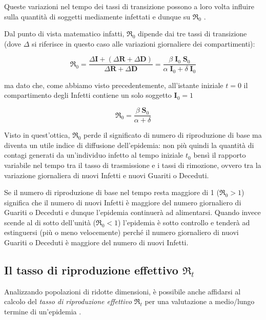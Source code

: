 \documentclass[11pt]{article}
\begin{document}
Queste variazioni nel tempo dei tassi di transizione possono a loro
volta influire sulla quantità di soggetti mediamente infettati e dunque
su \(\Re_0\) \cite{department_of_health} \cite{ceps_pubblication}
\cite{kissler_tedijanto_lipsitch_grad_2020}.

Dal punto di vista matematico infatti, \(\Re_0\) dipende dai tre tassi
di transizione (dove \(\Delta\) si riferisce in questo caso alle
variazioni giornaliere dei compartimenti):

\[ \Re_0 = \frac{ \Delta\mathbf{I} + (\Delta\mathbf{R} + \Delta\mathbf{D})}{ \Delta\mathbf{R} + \Delta\mathbf{D} } = \frac{ \beta \; \mathbf{I}_0 \; \mathbf{S}_0 }{ \alpha \; \mathbf{I}_0 + \delta \; \mathbf{I}_0} \]

ma dato che, come abbiamo visto precedentemente, all'istante iniziale
\(t=0\) il compartimento degli Infetti contiene un solo soggetto
\(\mathbf{I}_0 = 1\)

\[ \Re_0 = \frac{ \beta \; \mathbf{S}_0 }{ \alpha + \delta } \]

Visto in quest'ottica, \(\Re_0\) perde il significato di numero di
riproduzione di base ma diventa un utile indice di diffusione
dell'epidemia: non più quindi la quantità di contagi generati da
un'individuo infetto al tempo iniziale \(t_0\) bensì il rapporto
variabile nel tempo tra il tasso di trasmissione e i tassi di rimozione,
ovvero tra la variazione giornaliera di nuovi Infetti e nuovi Guariti o
Deceduti.

Se il numero di riproduzione di base nel tempo resta maggiore di 1
(\(\Re_0 > 1\)) significa che il numero di nuovi Infetti è maggiore del
numero giornaliero di Guariti o Deceduti e dunque l'epidemia continuerà
ad alimentarsi. Quando invece scende al di sotto dell'unità
(\(\Re_0 < 1\)) l'epidemia è sotto controllo e tenderà ad estinguersi
(più o meno velocemente) perché il numero giornaliero di nuovi Guariti o
Deceduti è maggiore del numero di nuovi Infetti.

    \hypertarget{il-tasso-di-riproduzione-effettivo-re_t}{%
\subsection{\texorpdfstring{Il tasso di riproduzione effettivo
\(\Re_t\)}{Il tasso di riproduzione effettivo \textbackslash Re\_t}}\label{il-tasso-di-riproduzione-effettivo-re_t}}

    Analizzando popolazioni di ridotte dimensioni, è possibile anche
affidarsi al calcolo del \emph{tasso di riproduzione effettivo}
\(\Re_t\) per una valutazione a medio/lungo termine di un'epidemia
\cite{k-sys} \cite{bettencourt_ribeiro_2008}.
\end{document}
